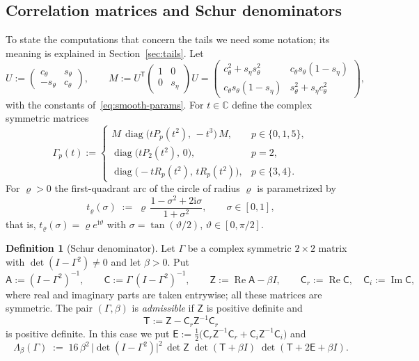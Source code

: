 \documentclass[11pt,reqno]{amsart}
\theoremstyle{definition}
\newtheorem{definition}[theorem]{Definition}
\numberwithin{equation}{section}
\newcommand{\C}{\mathbb{C}}
\newcommand{\ii}{\mathrm{i}}
\newcommand{\sA}{\mathsf{A}}
\newcommand{\sC}{\mathsf{C}}
\newcommand{\sZ}{\mathsf{Z}}
\newcommand{\sT}{\mathsf{T}}
\newcommand{\sE}{\mathsf{E}}
\DeclareMathOperator{\RePart}{Re}
\DeclareMathOperator{\ImPart}{Im}
\DeclareMathOperator{\diag}{diag}
\begin{document}
\subsection{Correlation matrices and Schur denominators}\label{sec:schur-def}
To state the computations that concern the tails we need some notation; its meaning is explained in Section~\ref{sec:tails}. Let
\[
  U:=\begin{pmatrix}c_\theta&s_\theta\\-s_\theta&c_\theta\end{pmatrix},\qquad
  M:=U^{\mathsf{T}}\begin{pmatrix}1&0\\0&s_\eta\end{pmatrix}U
  =\begin{pmatrix}c_\theta^2+s_\eta s_\theta^2&c_\theta s_\theta(1-s_\eta)\\ c_\theta s_\theta(1-s_\eta)&s_\theta^2+s_\eta c_\theta^2\end{pmatrix},
\]
with the constants of~\eqref{eq:smooth-params}. For $t\in\C$ define the complex symmetric matrices
\begin{equation}\label{eq:Gamma-p}
  \Gamma_p(t):=
  \begin{cases}
    M\,\diag\bigl(tP_p(t^2),\,-t^3\bigr)\,M, & p\in\{0,1,5\},\\[2pt]
    \diag\bigl(tP_2(t^2),\,0\bigr), & p=2,\\[2pt]
    \diag\bigl(-tR_p(t^2),\,tR_p(t^2)\bigr), & p\in\{3,4\}.
  \end{cases}
\end{equation}
For $\varrho>0$ the first-quadrant arc of the circle of radius $\varrho$ is parametrized by
\begin{equation}\label{eq:chart}
  t_\varrho(\sigma)\;:=\;\varrho\,\frac{1-\sigma^2+2\ii\sigma}{1+\sigma^2},\qquad \sigma\in[0,1],
\end{equation}
that is, $t_\varrho(\sigma)=\varrho e^{\ii\vartheta}$ with $\sigma=\tan(\vartheta/2)$, $\vartheta\in[0,\pi/2]$.

\begin{definition}[Schur denominator]\label{def:schur}
Let $\Gamma$ be a complex symmetric $2\times2$ matrix with $\det(I-\Gamma^2)\ne0$ and let $\beta>0$. Put
\[
  \sA:=(I-\Gamma^2)^{-1},\qquad \sC:=\Gamma\,(I-\Gamma^2)^{-1},\qquad \sZ:=\RePart\sA-\beta I,\qquad \sC_r:=\RePart\sC,\quad\sC_i:=\ImPart\sC ,
\]
where real and imaginary parts are taken entrywise; all these matrices are symmetric. The pair $(\Gamma,\beta)$ is \emph{admissible} if $\sZ$ is positive definite and
\[
  \sT:=\sZ-\sC_r\sZ^{-1}\sC_r
\]
is positive definite. In this case we put $\sE:=\frac12\bigl(\sC_r\sZ^{-1}\sC_r+\sC_i\sZ^{-1}\sC_i\bigr)$ and
\[
  \Lambda_\beta(\Gamma)\;:=\;16\,\beta^2\,\bigl|\det(I-\Gamma^2)\bigr|^2\,\det\sZ\;\det(\sT+\beta I)\;\det(\sT+2\sE+\beta I).
\]
\end{definition}
\end{document}
